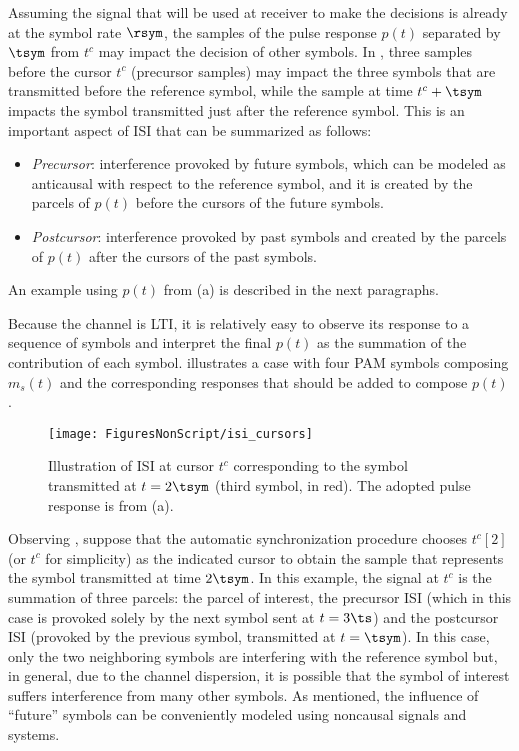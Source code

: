 Assuming the signal that will be used at receiver to make the decisions is already
at the symbol rate $\rsym$, the samples of the pulse response $p(t)$ separated by
$\tsym$ from $t^c$ may impact the decision of other symbols. In ,
three samples before the cursor $t^c$ (precursor samples) may impact the three symbols
that are transmitted before the reference symbol, while the sample at time $t^c + \tsym$
impacts the symbol transmitted just after the reference symbol. This is an important aspect
of ISI that can be summarized as follows:
\begin{itemize}
	\item \emph{Precursor}: interference provoked by future symbols, which can be modeled as
	anticausal with respect to the reference symbol, and it is created by the parcels of $p(t)$ 
	before the cursors of the future symbols.
	\item \emph{Postcursor}: interference provoked by past symbols and created by the parcels of $p(t)$ 
	after the cursors of the past symbols.
\end{itemize}
An example using $p(t)$ from (a) is described in the next paragraphs.

Because the channel is LTI, it is relatively easy to observe its response to a sequence of symbols
and interpret the final $p(t)$ as the summation of the contribution of each symbol.  illustrates a case with four PAM symbols composing $m_s(t)$ and the corresponding
responses that should be added to compose $p(t)$.

\begin{figure}[htbp]
\centering
\texttt{[image: FiguresNonScript/isi\_cursors]}
\caption[Illustration of ISI at cursor $t^c$ corresponding to the symbol transmitted at $t=2\tsym$.]{Illustration of ISI at cursor $t^c$ corresponding to the symbol transmitted at $t=2\tsym$ (third symbol, in red). The adopted pulse response is from (a).\label{fig:isi_cursors}}
\end{figure}

Observing , suppose that the automatic synchronization procedure chooses $t^c[2]$ 
(or $t^c$ for simplicity) as the indicated
cursor to obtain the sample that represents the symbol transmitted at time $2 \tsym$. 
In this example, the signal at $t^c$ is the summation of three parcels: 
the parcel of interest, the precursor ISI (which in this case is provoked solely
by the next symbol sent at $t=3\ts$) and the 
postcursor ISI (provoked by the previous symbol, transmitted at $t=\tsym$). In this case, only the two neighboring symbols are interfering
with the reference symbol but, in general, due to the channel dispersion, it is possible that the symbol of interest suffers interference from many other symbols. As mentioned, the influence of ``future'' symbols 
 can be conveniently modeled using noncausal signals and systems.

